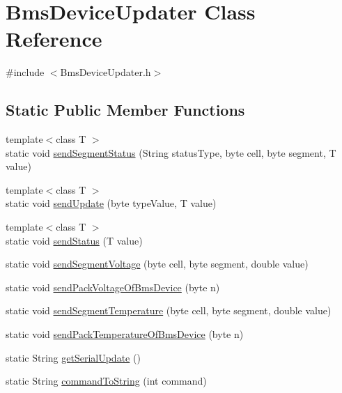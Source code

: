 \hypertarget{class_bms_device_updater}{}\section{Bms\+Device\+Updater Class Reference}
\label{class_bms_device_updater}


{\ttfamily \#include $<$Bms\+Device\+Updater.\+h$>$}

\subsection*{Static Public Member Functions}
\begin{DoxyCompactItemize}
\item 
{\footnotesize template$<$class T $>$ }\\static void \hyperlink{class_bms_device_updater_a6ddc61da65da16ff6c24995f43f0a6c1}{send\+Segment\+Status} (String status\+Type, byte cell, byte segment, T value)
\item 
{\footnotesize template$<$class T $>$ }\\static void \hyperlink{class_bms_device_updater_a9449da7019249fb3ce825c12fb61c134}{send\+Update} (byte type\+Value, T value)
\item 
{\footnotesize template$<$class T $>$ }\\static void \hyperlink{class_bms_device_updater_a5cc748a486645d1af6f675274f0d29ae}{send\+Status} (T value)
\item 
static void \hyperlink{class_bms_device_updater_ab1873577d7413c453222da23b8f6a1ac}{send\+Segment\+Voltage} (byte cell, byte segment, double value)
\item 
static void \hyperlink{class_bms_device_updater_a655ccc4e5f315c383d066c502b73b9e2}{send\+Pack\+Voltage\+Of\+Bms\+Device} (byte n)
\item 
static void \hyperlink{class_bms_device_updater_aae3a833fa2bd8403d9b55c358a6d2820}{send\+Segment\+Temperature} (byte cell, byte segment, double value)
\item 
static void \hyperlink{class_bms_device_updater_ac2bf4bba3100b48c1f8b42d21c8670f1}{send\+Pack\+Temperature\+Of\+Bms\+Device} (byte n)
\item 
static String \hyperlink{class_bms_device_updater_a9c5b00e6d5f24df9a7adbb2b772cfafd}{get\+Serial\+Update} ()
\item 
static String \hyperlink{class_bms_device_updater_aff1720a11582bd1353c50ced9352eda9}{command\+To\+String} (int command)
\end{DoxyCompactItemize}


